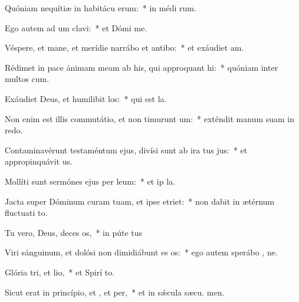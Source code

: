 \item Quóniam nequítiæ in habitácu erum:~* in médi rum.
\item Ego autem ad um clavi:~* et Dómi  me.
\item Véspere, et mane, et merídie narrábo et antibo:~* et exáudiet  am.
\item Rédimet in pace ánimam meam ab his, qui approquant hi:~* quóniam inter multos  cum.
\item Exáudiet Deus, et humilibit los:~* qui est  la.
\item Non enim est illis commutátio, et non timurunt um:~* exténdit manum suam in redo.
\item Contaminavérunt testaméntum ejus, divísi sunt ab ira tus jus:~* et appropinquávit  us.
\item Mollíti sunt sermónes ejus per leum:~* et ip  la.
\item Jacta super Dóminum curam tuam, et ipse  etriet:~* non dabit in ætérnum fluctuati to.
\item Tu vero, Deus, deces os,~* in púte tus
\item Viri sánguinum, et dolósi non dimidiábunt es os:~* ego autem sperábo  , ne.
\item Glória tri, et lio,~* et Spirí to.
\item Sicut erat in princípio, et , et per,~* et in sǽcula sæcu. men.
